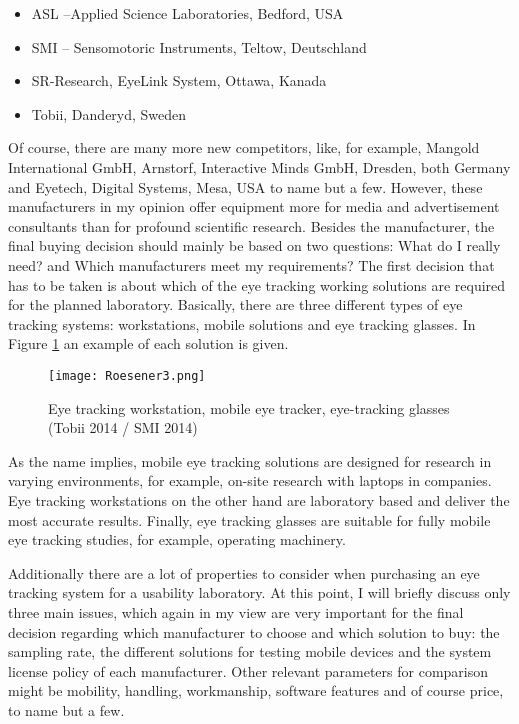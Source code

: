 \begin{
}[h]
\begin{itemize}
\item ASL –Applied Science Laboratories, Bedford, USA
\item SMI – Sensomotoric Instruments, Teltow, Deutschland
\item SR-Research, EyeLink System, Ottawa, Kanada
\item Tobii, Danderyd, Sweden 
\end{itemize}


Of course, there are many more new competitors, like, for example, Mangold International GmbH, Arnstorf, Interactive Minds GmbH, Dresden, both Germany and Eyetech, Digital Systems, Mesa, USA to name but a few. However, these manufacturers in my opinion offer equipment more for media and advertisement consultants than for profound scientific research. Besides the manufacturer, the final buying decision should mainly be based on two questions: {\textquotedbl}What do I really need?{\textquotedbl} and {\textquotedbl}Which manufacturers meet my requirements?{\textquotedbl} The first decision that has to be taken is about which of the eye tracking working solutions are required for the planned laboratory. Basically, there are three different types of eye tracking systems: workstations, mobile solutions and eye tracking glasses. In Figure \ref{fig:3} an example of each solution is given.


 
\begin{figure}[h]
 \texttt{[image: Roesener3.png]}
 \caption{Eye tracking workstation, mobile eye tracker, eye-tracking glasses (Tobii 2014 / SMI 2014)}
 \label{fig:3}
\end{figure} 


As the name implies, mobile eye tracking solutions are designed for research in varying environments, for example, on-site research with laptops in companies. Eye tracking workstations on the other hand are laboratory based and deliver the most accurate results. Finally, eye tracking glasses are suitable for fully mobile eye tracking studies, for example, operating machinery.

\begin{styleBodyTextIndent}
Additionally there are a lot of properties to consider when purchasing an eye tracking system for a usability laboratory. At this point, I will briefly discuss only three main issues, which again in my view are very important for the final decision regarding which manufacturer to choose and which solution to buy: the sampling rate, the different solutions for testing mobile devices and the system license policy of each manufacturer. Other relevant parameters for comparison might be mobility, handling, workmanship, software features and of course price, to name but a few. 
\end{styleBodyTextIndent}


\end{
}
